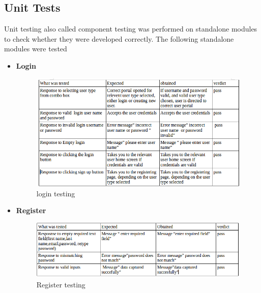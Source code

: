 \documentclass[12pt]{article}
\begin{document}
\subsection{Unit Tests}
Unit testing also called component testing was performed on standalone modules to check whether they were developed correctly. The following standalone modules were tested
\begin{itemize}
\item \textbf{Login}
\begin{figure}[h]
    \centering
    
    \includegraphics[width=\linewidth]{Logins.png}
    \caption{login testing}
    \label{fig:ERD}
    \end{figure}
\newpage
\item \textbf{Register}
\begin{figure}[h]
    \centering
    
    \includegraphics[width=\linewidth]{register.png}
    \caption{Register testing}
    \label{fig:ERD}
    \end{figure}

\end{itemize}

 
\end{document}

